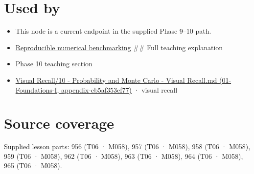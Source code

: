 \section{Used by}\label{appendix-bcc44e9d3d02-used-by}

\begin{itemize}
\item
  This node is a current endpoint in the supplied Phase 9--10 path.
\item
  \hyperref[appendix-b9db93e28371]{Reproducible numerical benchmarking} \#\# Full teaching explanation
\item
  \href{Continuous\%20Notes/Computing\%20Foundations\%20-\%20From\%20Bits\%20to\%20C++\%20and\%20Systems\%20APIs\#10.\%20Inference\%20and\%20error\%20metrics\%20need\%20explicit\%20assumptions}{Phase 10 teaching section}
\item
  \href{../01-Foundations-I/main.pdf\#nameddest=appendix-cb5af353ef77}{Visual Recall/10 - Probability and Monte Carlo - Visual Recall.md (01-Foundations-I, appendix-cb5af353ef77)} · visual recall
\end{itemize}

\section{Source coverage}\label{appendix-bcc44e9d3d02-source-coverage}

Supplied lesson parts: 956 (T06 · M058), 957 (T06 · M058), 958 (T06 · M058), 959 (T06 · M058), 962 (T06 · M058), 963 (T06 · M058), 964 (T06 · M058), 965 (T06 · M058).

